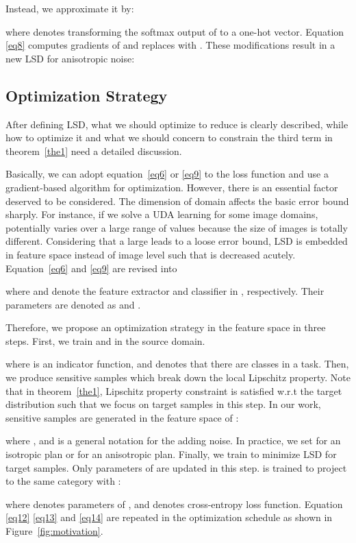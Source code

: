 \documentclass[10pt,twocolumn,letterpaper]{article}
\begin{document}
Instead, we approximate it by:

where  denotes transforming the softmax output of  to a one-hot vector. Equation \ref{eq8} computes gradients of  and replaces  with . These modifications result in a new LSD for anisotropic noise:
  

\subsection{Optimization Strategy}

After defining LSD, what we should optimize to reduce  is clearly described, while how to optimize it and what we should concern to constrain the third term in theorem~\ref{the1} need a detailed discussion.

Basically, we can adopt equation~\ref{eq6} or \ref{eq9} to the loss function and use a gradient-based algorithm for optimization. However, there is an essential factor deserved to be considered. The dimension of domain  affects the basic error bound sharply. For instance, if we solve a UDA learning for some image domains,  potentially varies over a large range of values because the size of images is totally different. Considering that a large  leads to a loose error bound, LSD is embedded in feature space instead of image level such that  is decreased acutely. Equation~\ref{eq6} and \ref{eq9} are revised into


where  and  denote the feature extractor and classifier in , respectively. Their parameters are denoted as  and .

Therefore, we propose an optimization strategy in the feature space in three steps. First, we train  and  in the source domain.
 
where  is an indicator function, and  denotes that there are  classes in a task. Then, we produce sensitive samples which break down the local Lipschitz property. Note that in theorem~\ref{the1}, Lipschitz property constraint is satisfied w.r.t the target distribution such that we focus on target samples in this step. In our work, sensitive samples  are generated in the feature space of :

where , and  is a general notation for the adding noise. In practice, we set  for an isotropic plan or  for an anisotropic plan. Finally, we train  to minimize LSD for target samples. Only parameters of  are updated in this step.  is trained to project  to the same category with :

where  denotes parameters of , and  denotes cross-entropy loss function. Equation \ref{eq12} \ref{eq13} and \ref{eq14} are repeated in the optimization schedule as shown in Figure~\ref{fig:motivation}.
\end{document}
